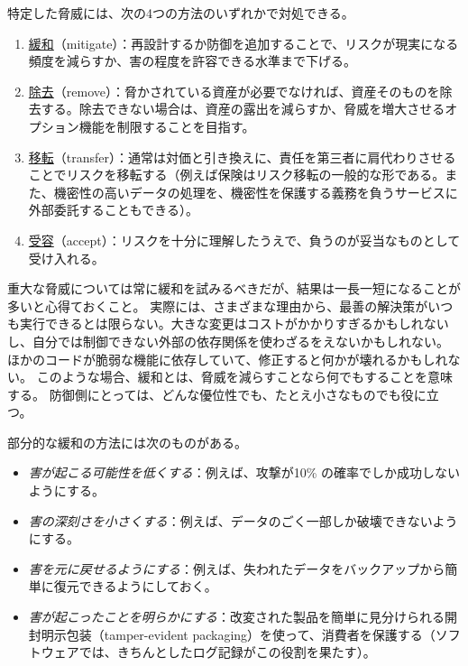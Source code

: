 \documentclass[uplatex]{jsarticle}
\def\label#1{}%
\begin{document}
\begin{dfn}\label{dfn:ch2-four-ways-to-handle-threats}
特定した脅威には、次の4つの方法のいずれかで対処できる。
\begin{enumerate}
\item \underline{緩和}（mitigate）：再設計するか防御を追加することで、リスクが現実になる頻度を減らすか、害の程度を許容できる水準まで下げる。
\item \underline{除去}（remove）：脅かされている資産が必要でなければ、資産そのものを除去する。除去できない場合は、資産の露出を減らすか、脅威を増大させるオプション機能を制限することを目指す。
\item \underline{移転}（transfer）：通常は対価と引き換えに、責任を第三者に肩代わりさせることでリスクを移転する（例えば保険はリスク移転の一般的な形である。また、機密性の高いデータの処理を、機密性を保護する義務を負うサービスに外部委託することもできる）。
\item \underline{受容}（accept）：リスクを十分に理解したうえで、負うのが妥当なものとして受け入れる。
\end{enumerate}
\end{dfn}

重大な脅威については常に緩和を試みるべきだが、結果は一長一短になることが多いと心得ておくこと。
実際には、さまざまな理由から、最善の解決策がいつも実行できるとは限らない。大きな変更はコストがかかりすぎるかもしれないし、自分では制御できない外部の依存関係を使わざるをえないかもしれない。
ほかのコードが脆弱な機能に依存していて、修正すると何かが壊れるかもしれない。
このような場合、緩和とは、脅威を減らすことなら何でもすることを意味する。
防御側にとっては、どんな優位性でも、たとえ小さなものでも役に立つ。

\begin{dfn}[部分的な緩和]\label{dfn:ch2-partial-mitigation}
部分的な緩和の方法には次のものがある。
\begin{itemize}
\item \emph{害が起こる可能性を低くする}：例えば、攻撃が10\% の確率でしか成功しないようにする。
\item \emph{害の深刻さを小さくする}：例えば、データのごく一部しか破壊できないようにする。
\item \emph{害を元に戻せるようにする}：例えば、失われたデータをバックアップから簡単に復元できるようにしておく。
\item \emph{害が起こったことを明らかにする}：改変された製品を簡単に見分けられる開封明示包装（tamper-evident packaging）を使って、消費者を保護する（ソフトウェアでは、きちんとしたログ記録がこの役割を果たす）。
\end{itemize}
\end{dfn}
\end{document}
